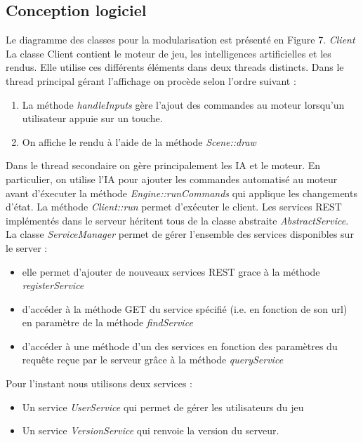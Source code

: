 \documentclass[a4paper,12pt]{article}
\begin{document}
    
    
    
    \clearpage
    \subsection{Conception logiciel}
    Le diagramme des classes pour la modularisation est présenté en Figure 7.
    \emph{Client} La classe Client contient le moteur de jeu, les intelligences artificielles et les rendus. Elle utilise ces différents éléments dans deux threads distincts. Dans le thread principal gérant l'affichage on procède selon l'ordre suivant :
\begin{enumerate}
\item La méthode \emph{handleInputs} gère l'ajout des commandes au moteur lorsqu'un utilisateur appuie sur un touche.
\item On affiche le rendu à l'aide de la méthode \emph{Scene::draw}
\end{enumerate}

 Dans le thread secondaire on gère principalement les IA et le moteur. En particulier, on  utilise l'IA pour ajouter les commandes automatisé au moteur avant d'éxecuter la méthode \emph{Engine::runCommands} qui applique les changements d'état.
    La méthode \emph{Client::run} permet d'exécuter le client. 
    Les services REST implémentés dans le serveur héritent tous de la classe abstraite \emph{AbstractService}.  La classe \emph{ServiceManager} permet de gérer l'ensemble des services disponibles sur le server :
    
\begin{itemize}
\item elle permet d'ajouter de nouveaux services REST grace à la méthode \emph{registerService}
\item d'accéder à la méthode GET du service spécifié (i.e. en fonction de son url) en paramètre de la méthode \emph{findService}
\item  d'accéder à une méthode d'un des services en fonction des paramètres du requête reçue par le serveur grâce à la méthode \emph{queryService}
\end{itemize}
    
    Pour l'instant nous utilisons deux services :
    
\begin{itemize}
\item Un service \emph{UserService} qui permet de gérer les utilisateurs du jeu
\item Un service \emph{VersionService} qui renvoie la version du serveur.
\end{itemize} \\
\end{document}
